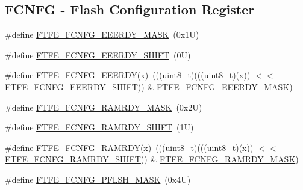 \subsection*{F\+C\+N\+FG -\/ Flash Configuration Register}
\begin{DoxyCompactItemize}
\item 
\#define \mbox{\hyperlink{group___f_t_f_e___register___masks_gabd7f0b0695b1e55349fef4587df62034}{F\+T\+F\+E\+\_\+\+F\+C\+N\+F\+G\+\_\+\+E\+E\+E\+R\+D\+Y\+\_\+\+M\+A\+SK}}~(0x1\+U)
\item 
\#define \mbox{\hyperlink{group___f_t_f_e___register___masks_ga9587828c6c069eca8571ac30f362db64}{F\+T\+F\+E\+\_\+\+F\+C\+N\+F\+G\+\_\+\+E\+E\+E\+R\+D\+Y\+\_\+\+S\+H\+I\+FT}}~(0\+U)
\item 
\#define \mbox{\hyperlink{group___f_t_f_e___register___masks_ga72cde7b7ce49b7e7eb95ba73a3d81826}{F\+T\+F\+E\+\_\+\+F\+C\+N\+F\+G\+\_\+\+E\+E\+E\+R\+DY}}(x)~(((uint8\+\_\+t)(((uint8\+\_\+t)(x)) $<$$<$ \mbox{\hyperlink{group___f_t_f_e___register___masks_ga9587828c6c069eca8571ac30f362db64}{F\+T\+F\+E\+\_\+\+F\+C\+N\+F\+G\+\_\+\+E\+E\+E\+R\+D\+Y\+\_\+\+S\+H\+I\+FT}})) \& \mbox{\hyperlink{group___f_t_f_e___register___masks_gabd7f0b0695b1e55349fef4587df62034}{F\+T\+F\+E\+\_\+\+F\+C\+N\+F\+G\+\_\+\+E\+E\+E\+R\+D\+Y\+\_\+\+M\+A\+SK}})
\item 
\#define \mbox{\hyperlink{group___f_t_f_e___register___masks_gabfae504593e38f672188b415d986d4d3}{F\+T\+F\+E\+\_\+\+F\+C\+N\+F\+G\+\_\+\+R\+A\+M\+R\+D\+Y\+\_\+\+M\+A\+SK}}~(0x2\+U)
\item 
\#define \mbox{\hyperlink{group___f_t_f_e___register___masks_ga112f1ba27f929163498d8ba3f6fb6fdc}{F\+T\+F\+E\+\_\+\+F\+C\+N\+F\+G\+\_\+\+R\+A\+M\+R\+D\+Y\+\_\+\+S\+H\+I\+FT}}~(1\+U)
\item 
\#define \mbox{\hyperlink{group___f_t_f_e___register___masks_ga553cc788106bedcbeb729d73b790822e}{F\+T\+F\+E\+\_\+\+F\+C\+N\+F\+G\+\_\+\+R\+A\+M\+R\+DY}}(x)~(((uint8\+\_\+t)(((uint8\+\_\+t)(x)) $<$$<$ \mbox{\hyperlink{group___f_t_f_e___register___masks_ga112f1ba27f929163498d8ba3f6fb6fdc}{F\+T\+F\+E\+\_\+\+F\+C\+N\+F\+G\+\_\+\+R\+A\+M\+R\+D\+Y\+\_\+\+S\+H\+I\+FT}})) \& \mbox{\hyperlink{group___f_t_f_e___register___masks_gabfae504593e38f672188b415d986d4d3}{F\+T\+F\+E\+\_\+\+F\+C\+N\+F\+G\+\_\+\+R\+A\+M\+R\+D\+Y\+\_\+\+M\+A\+SK}})
\item 
\#define \mbox{\hyperlink{group___f_t_f_e___register___masks_ga22150d49ad85cccc858cc662646709fc}{F\+T\+F\+E\+\_\+\+F\+C\+N\+F\+G\+\_\+\+P\+F\+L\+S\+H\+\_\+\+M\+A\+SK}}~(0x4\+U)
\item 

\end{DoxyCompactItemize}
